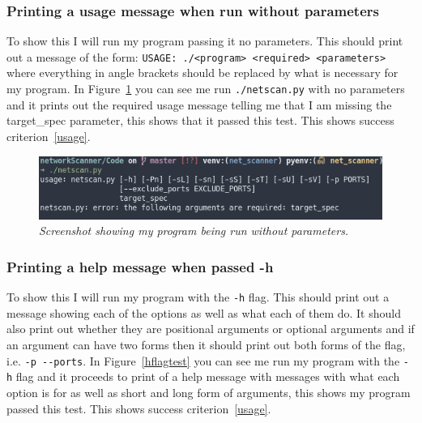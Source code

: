 \documentclass[titlepage]{article}
\let\Oldsubsubsection\subsubsection{}
\renewcommand{\subsubsection}{\FloatBarrier\Oldsubsubsection}
\begin{document}
\subsubsection{Printing a usage message when run without parameters}\label{test:usage}

To show this I will run my program passing it no parameters.
This should print out a message of the form: \verb|USAGE: ./<program> <required> <parameters>|
where everything in angle brackets should be replaced by what is necessary for my program. 
In Figure~\ref{noparametertest} you can see me run \verb|./netscan.py| with no parameters and it
prints out the required usage message telling me that I am missing the target\_spec parameter, this
shows that it passed this test.
This shows success criterion~\ref{usage}.
\begin{figure}[H]
  \centering
  \includegraphics[width=\textwidth]{noparameters.png}
  \caption{\textit{%
    Screenshot showing my program being run without parameters.
}}\label{noparametertest}
\end{figure}

\subsubsection{Printing a help message when passed -h}\label{test:hmessage}

To show this I will run my program with the \verb|-h| flag.
This should print out a message showing each of the options as well as what each of them do.
It should also print out whether they are positional arguments or optional arguments and if
an argument can have two forms then it should print out both forms of the flag, i.e. \verb|-p --ports|.
In Figure~\ref{hflagtest} you can see me run my program with the \verb|-h| flag and it proceeds to
print of a help message with messages with what each option is for as well as short and long form of
arguments, this shows my program passed this test.
This shows success criterion~\ref{usage}.
\end{document}
